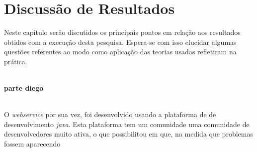 \documentclass[french]{article}
\begin{document}
\section{Discussão de Resultados}

	\par Neste capítulo serão discutidos os principais pontos em relação aos resultados
obtidos com a execução desta pesquisa. Espera-se com isso elucidar algumas questões
referentes ao modo como aplicação das teorias usadas refletiram na prática.\\\\
	\par \textbf{parte diego}\\\\

	\par O \textit{webservice} por sua vez, foi desenvolvido usando a plataforma de 
de desenvolvimento \textit{java}. Esta plataforma tem um comunidade uma comunidade de 
desenvolvedores muito ativa, o que possibilitou em que, na medida que problemas fossem 
aparecendo
	
\end{document}
